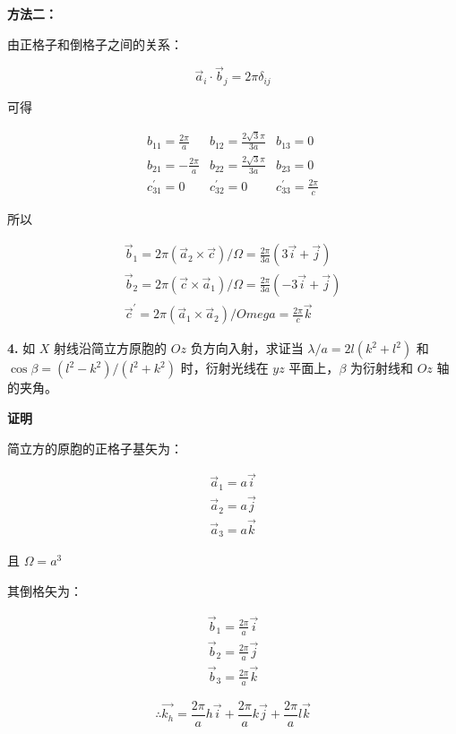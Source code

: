 \noindent \textbf{方法二：}

由正格子和倒格子之间的关系：

\begin{equation*}
    \vec{a}_i \cdot \vec{b}_j = 2 \pi \delta_{ij}
\end{equation*}

可得

\begin{align*}
    b_{11} = \frac{2\pi}{a} & b_{12} = \frac{2\sqrt{3}\pi}{3a} & b_{13} = 0 \\
    b_{21} = -\frac{2\pi}{a} & b_{22} = \frac{2\sqrt{3}\pi}{3a} & b_{23} = 0 \\
    c_{31}^\prime = 0 & c_{32}^\prime = 0 & c_{33}^\prime = \frac{2\pi}{c}
\end{align*}

所以

\begin{align*}
    \vec{b}_1 = 2\pi (\vec{a}_2 \times \vec{c}) / \Omega = \frac{2\pi}{3a} (3\vec{i}+\vec{j}) \\
    \vec{b}_2 = 2\pi (\vec{c} \times \vec{a}_1) / \Omega = \frac{2\pi}{3a} (-3\vec{i}+\vec{j}) \\
    \vec{c}^\prime = 2\pi (\vec{a}_1 \times \vec{a}_2) / Omega = \frac{2\pi}{c} \vec{k}
\end{align*}

\noindent \textbf{4.\quad} 如 $X$ 射线沿简立方原胞的 $Oz$ 负方向入射，求证当 $\lambda/a=2l(k^2+l^2)$ 和 $\cos\beta=(l^2-k^2)/(l^2+k^2)$ 时，衍射光线在 $yz$ 平面上，$\beta$ 为衍射线和 $Oz$ 轴的夹角。

\noindent \textbf{证明}

简立方的原胞的正格子基矢为：

\begin{align*}
    \vec{a}_1 = a \vec{i} \\
    \vec{a}_2 = a \vec{j} \\
    \vec{a}_3 = a \vec{k}
\end{align*}

且 $\Omega=a^3$

其倒格矢为：

\begin{align*}
    \vec{b}_1 = \frac{2\pi}{a} \vec{i} \\
    \vec{b}_2 = \frac{2\pi}{a} \vec{j} \\
    \vec{b}_3 = \frac{2\pi}{a} \vec{k}
\end{align*}

\begin{equation*}
    \therefore \vec{k_h} = \frac{2\pi}{a} h \vec{i} + \frac{2\pi}{a} k \vec{j} + \frac{2\pi}{a} l \vec{k}
\end{equation*}

